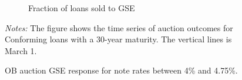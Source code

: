 \documentclass[11pt,a4paper]{article}
\begin{document}
\begin{figure}[h]
\begin{subfigure}[b]{0.49\textwidth}
      \caption{ Fraction of loans sold to GSE}
     \end{subfigure}
     \caption{OB auction  GSE response for note rates between 4\% and 4.75\%. }  
   \begin{minipage}{\textwidth}
      \footnotesize{\textit{Notes:} The figure shows the time series of auction outcomes for Conforming loans with a 30-year maturity. The vertical lines is March 1.  } 
      \end{minipage}
\end{figure}
\end{document}
